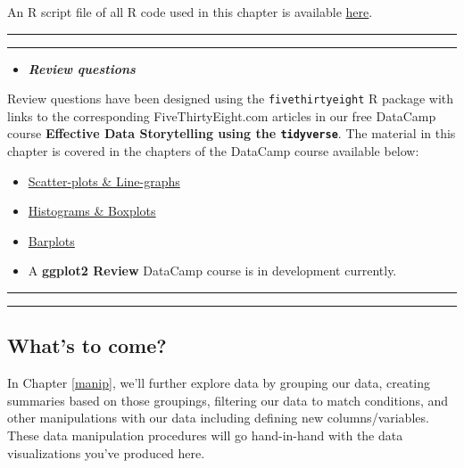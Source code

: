 \documentclass[]{tufte-book}
\let\oldrule=\rule
\renewcommand{\rule}[1]{\oldrule{\linewidth}}
\newenvironment{rmdblock}[1]
  {\begin{shaded*}
  \begin{itemize}
  \renewcommand{\labelitemi}{
    \raisebox{-.7\height}[0pt][0pt]{
    }
  }
  \item
  }
  {
  \end{itemize}
  \end{shaded*}
  }
\newenvironment{review}
  {\begin{rmdblock}{warning}}
  {\end{rmdblock}}
\begin{document}
An R script file of all R code used in this chapter is available
\href{http://ismayc.github.io/moderndiver-book/scripts/04-viz.R}{here}.

\begin{center}\rule{0.5\linewidth}{\linethickness}\end{center}

\begin{center}\rule{0.5\linewidth}{\linethickness}\end{center}

\begin{review}
\textbf{\emph{Review questions}}
\end{review}

Review questions have been designed using the \texttt{fivethirtyeight} R
package \citep{R-fivethirtyeight} with links to the corresponding
FiveThirtyEight.com articles in our free DataCamp course
\textbf{Effective Data Storytelling using the \texttt{tidyverse}}. The
material in this chapter is covered in the chapters of the DataCamp
course available below:

\begin{itemize}
\item
  \href{https://campus.datacamp.com/courses/effective-data-storytelling-using-the-tidyverse/scatter-plots-line-graphs}{Scatter-plots
  \& Line-graphs}
\item
  \href{https://campus.datacamp.com/courses/effective-data-storytelling-using-the-tidyverse/histograms-boxplots}{Histograms
  \& Boxplots}
\item
  \href{https://campus.datacamp.com/courses/effective-data-storytelling-using-the-tidyverse/barplots}{Barplots}
\item
  A \textbf{ggplot2 Review} DataCamp course is in development currently.
\end{itemize}

\begin{center}\rule{0.5\linewidth}{\linethickness}\end{center}

\begin{center}\rule{0.5\linewidth}{\linethickness}\end{center}

\subsection{What's to come?}\label{whats-to-come-1}

In Chapter \ref{manip}, we'll further explore data by grouping our data,
creating summaries based on those groupings, filtering our data to match
conditions, and other manipulations with our data including defining new
columns/variables. These data manipulation procedures will go
hand-in-hand with the data visualizations you've produced here.
\end{document}
